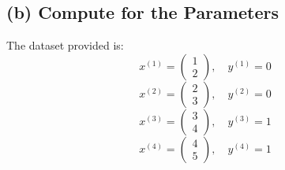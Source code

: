\documentclass[12pt]{article}
\begin{document}
\subsection*{(b) Compute for the Parameters}

The dataset provided is:
\[
x^{(1)} = \begin{pmatrix} 1 \\ 2 \end{pmatrix}, \quad y^{(1)} = 0
\]
\[
x^{(2)} = \begin{pmatrix} 2 \\ 3 \end{pmatrix}, \quad y^{(2)} = 0
\]
\[
x^{(3)} = \begin{pmatrix} 3 \\ 4 \end{pmatrix}, \quad y^{(3)} = 1
\]
\[
x^{(4)} = \begin{pmatrix} 4 \\ 5 \end{pmatrix}, \quad y^{(4)} = 1
\]
\end{document}
